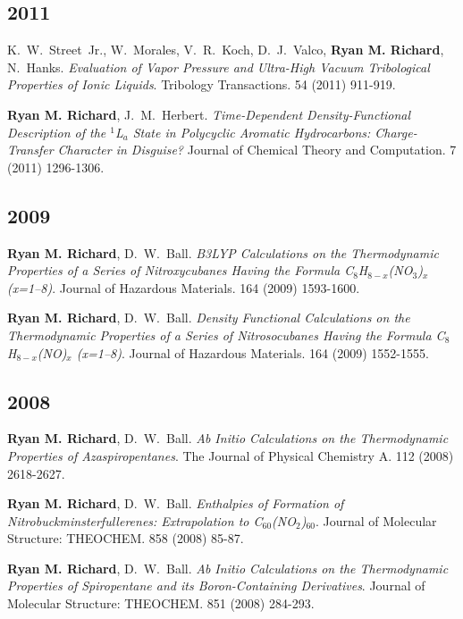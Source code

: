 \documentclass[11pt,a4paper,sans]{moderncv}
\begin{document}
\begin{etaremune}
	\subsection{2011}

	\item{K.~W.~Street~Jr., W.~Morales, V.~R.~Koch, D.~J.~Valco, \textbf{Ryan M. Richard}, N.~Hanks.  {\em Evaluation of Vapor Pressure and Ultra-High Vacuum Tribological Properties of Ionic Liquids}.  Tribology Transactions.  54 (2011) 911-919.}

	\item{\textbf{Ryan M. Richard},  J.~M.~Herbert. {\em Time-Dependent Density-Functional Description of the $^1$L$_a$ State in Polycyclic Aromatic Hydrocarbons: Charge-Transfer Character in Disguise?} Journal of Chemical Theory and Computation. 7 (2011) 1296-1306. }
	\subsection{2009}
	\item{\textbf{Ryan M. Richard}, D.~W.~Ball. {\em B3LYP Calculations on the Thermodynamic Properties of a Series of Nitroxycubanes Having the Formula C$_8$H$_{8-x}$(NO$_3$)$_x$ (x=1--8)}.  Journal of Hazardous Materials.  164 (2009) 1593-1600.}

	\item{\textbf{Ryan M. Richard}, D.~W.~Ball.  {\em Density Functional Calculations on the Thermodynamic Properties of a Series of Nitrosocubanes Having the Formula C$_8$H$_{8-x}$(NO)$_x$ (x=1--8)}.  Journal of Hazardous Materials. 164 (2009) 1552-1555.}
	\subsection{2008}
	\item{\textbf{Ryan M. Richard}, D.~W.~Ball.  {\em  Ab Initio Calculations on the Thermodynamic Properties of Azaspiropentanes}.  The Journal of Physical Chemistry A.  112 (2008) 2618-2627.}

	\item{\textbf{Ryan M. Richard}, D.~W.~Ball. {\em Enthalpies of Formation of Nitrobuckminsterfullerenes: Extrapolation to C$_{60}$(NO$_2$)$_{60}$}.  Journal of Molecular Structure: THEOCHEM.  858 (2008) 85-87.}

	\item{\textbf{Ryan M. Richard}, D.~W.~Ball. {\em Ab Initio Calculations on the Thermodynamic Properties of Spiropentane and its Boron-Containing Derivatives}.  Journal of Molecular Structure: THEOCHEM.  851 (2008) 284-293.}


\end{etaremune}
\end{document}
